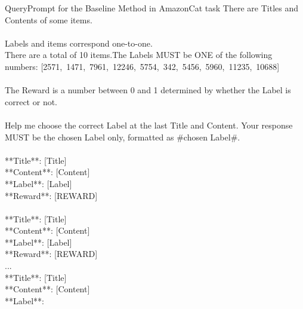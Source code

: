 \begin{mycolorbox}{Query}{Prompt for the Baseline Method in AmazonCat task}
\small
There are Titles and Contents of some items. \\\\
Labels and items correspond one-to-one.\\
There are a total of 10 items.The Labels MUST be ONE of the following numbers: \mbox{[2571, 1471, 7961, 12246, 5754, 342, 5456, 5960, 11235, 10688]}\\\\
The Reward is a number between 0 and 1 determined by whether the Label is correct or not.\\\\
Help me choose the correct Label at the last Title and Content. Your response MUST be the chosen Label only, formatted as \#chosen Label\#.\\\\
**Title**: \mbox{[Title]}\\
**Content**: \mbox{[Content]}\\
**Label**: \mbox{[Label]}\\
**Reward**: \mbox{[REWARD]}\\\\
**Title**: \mbox{[Title]}\\
**Content**: \mbox{[Content]}\\
**Label**: \mbox{[Label]}\\
**Reward**: \mbox{[REWARD]}\\

...\\

**Title**: \mbox{[Title]}\\
**Content**: \mbox{[Content]}\\
**Label**:
\end{mycolorbox}




